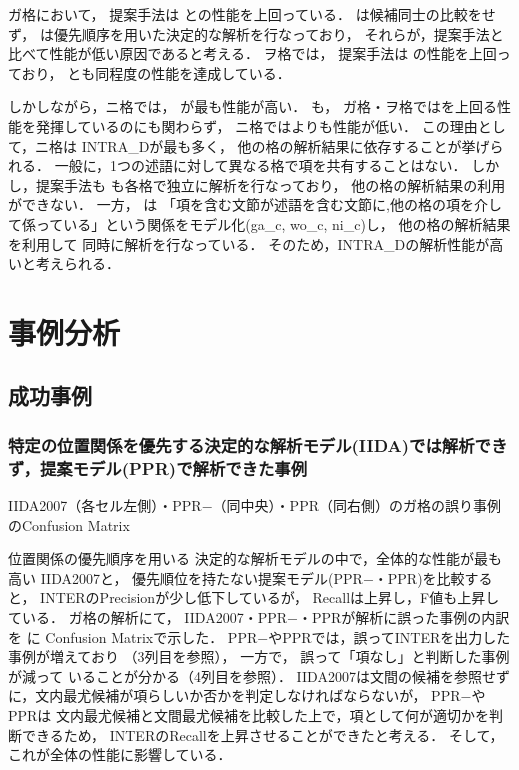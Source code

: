 \documentclass[japanese]{jnlp_1.4}
\newcommand{\tblref}[1]{}
\begin{document}
ガ格において，
提案手法は
との性能を上回っている．
は候補同士の比較をせず，
は優先順序を用いた決定的な解析を行なっており，
それらが，提案手法と比べて性能が低い原因であると考える．
ヲ格では，
提案手法は
の性能を上回っており，
とも同程度の性能を達成している．




しかしながら，ニ格では，
が最も性能が高い．
も，
ガ格・ヲ格ではを上回る性能を発揮しているのにも関わらず， 
ニ格ではよりも性能が低い．
この理由として，ニ格は
INTRA\_Dが最も多く，
他の格の解析結果に依存することが挙げられる．
一般に，1つの述語に対して異なる格で項を共有することはない．
しかし，提案手法も
も各格で独立に解析を行なっており，
他の格の解析結果の利用ができない．
一方，
は
「項を含む文節が述語を含む文節に,他の格の項を介して係っている」という関係をモデル化(ga\_c, wo\_c, ni\_c)し，
他の格の解析結果を利用して
同時に解析を行なっている．
そのため，INTRA\_Dの解析性能が高いと考えられる．


\section{事例分析}

\subsection{成功事例}

\subsubsection{特定の位置関係を優先する決定的な解析モデル(IIDA)では解析できず，提案モデル(PPR)で解析できた事例}


\begin{table}[b]
\caption{IIDA2007（各セル左側）・PPR$-$（同中央）・PPR（同右側）のガ格の誤り事例のConfusion Matrix}
\label{tbl:confusion-matrix-ga}

\end{table}

位置関係の優先順序を用いる
決定的な解析モデルの中で，全体的な性能が最も高い
IIDA2007と，
優先順位を持たない提案モデル(PPR$-$・PPR)を比較すると，
INTERのPrecisionが少し低下しているが，
Recallは上昇し，F値も上昇している．
ガ格の解析にて，
IIDA2007・PPR$-$・PPRが解析に誤った事例の内訳を
\tblref{tbl:confusion-matrix-ga}に
Confusion Matrixで示した．
PPR$-$やPPRでは，誤ってINTERを出力した事例が増えており
（3列目を参照），
一方で，
誤って「項なし」と判断した事例が減って
いることが分かる（4列目を参照）．
IIDA2007は文間の候補を参照せずに，文内最尤候補が項らしいか否かを判定しなければならないが，
PPR$-$やPPRは
文内最尤候補と文間最尤候補を比較した上で，項として何が適切かを判断できるため，
INTERのRecallを上昇させることができたと考える．
そして，これが全体の性能に影響している．
\end{document}

